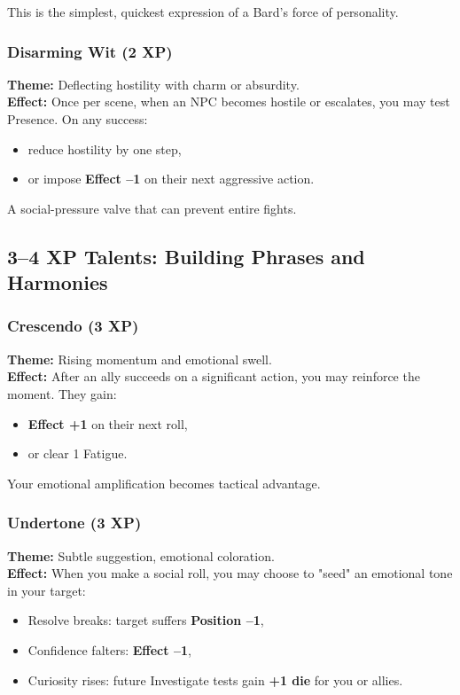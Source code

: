 \documentclass[11pt]{book}
\begin{document}
This is the simplest, quickest expression of a Bard's force of personality.

\subsubsection{Disarming Wit (2 XP)}
\textbf{Theme:} Deflecting hostility with charm or absurdity.\\
\textbf{Effect:} Once per scene, when an NPC becomes hostile or escalates,
you may test Presence. On any success:
\begin{itemize}
  \item reduce hostility by one step,
  \item or impose \textbf{Effect --1} on their next aggressive action.
\end{itemize}

A social-pressure valve that can prevent entire fights.

\subsection{3--4 XP Talents: Building Phrases and Harmonies}

\subsubsection{Crescendo (3 XP)}
\textbf{Theme:} Rising momentum and emotional swell.\\
\textbf{Effect:} After an ally succeeds on a significant action,
you may reinforce the moment. They gain:
\begin{itemize}
  \item \textbf{Effect +1} on their next roll,
  \item or clear 1 Fatigue.
\end{itemize}

Your emotional amplification becomes tactical advantage.

\subsubsection{Undertone (3 XP)}
\textbf{Theme:} Subtle suggestion, emotional coloration.\\
\textbf{Effect:} When you make a social roll,
you may choose to "seed" an emotional tone in your target:
\begin{itemize}
  \item Resolve breaks: target suffers \textbf{Position --1},
  \item Confidence falters: \textbf{Effect --1},
  \item Curiosity rises: future Investigate tests gain \textbf{+1 die} for you or allies.
\end{itemize}
\end{document}

